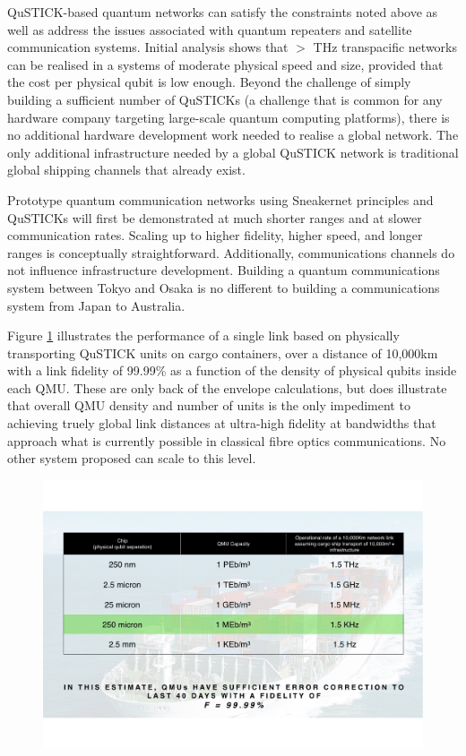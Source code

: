 \documentclass[twocolumn, aps, rmp, amsmath, amssymb, nofootinbib, superscriptaddress, longbibliography, floatfix, table-of-contents, eqsecnum]{revtex4-2}
\begin{document}
QuSTICK-based quantum networks can satisfy the constraints noted above as well as address the issues associated with quantum repeaters and satellite communication systems. Initial analysis shows that $>$ THz transpacific networks can be realised in a systems of moderate physical speed and size, provided that the cost per physical qubit is low enough. Beyond the challenge of simply building a sufficient number of QuSTICKs (a challenge that is common for any hardware company targeting large-scale quantum computing platforms), there is no additional hardware development work needed to realise a global network. The only additional infrastructure needed by a global QuSTICK network is traditional global shipping channels that already exist. 

Prototype quantum communication networks using Sneakernet principles and QuSTICKs will first be demonstrated at much shorter ranges and at slower communication rates. Scaling up to higher fidelity, higher speed, and longer ranges is conceptually straightforward. Additionally, communications channels do not influence infrastructure development. Building a quantum communications system between Tokyo and Osaka is no different to building a communications system from Japan to Australia. 

Figure \ref{fig:link} illustrates the performance of a single link based on physically transporting QuSTICK units on cargo containers, over a distance of 10,000km with a link fidelity of 99.99\% as a function of the density of physical qubits inside each QMU. These are only back of the envelope calculations, but does illustrate that overall QMU density and number of units is the only impediment to achieving truely global link distances at ultra-high fidelity at bandwidths that approach what is currently possible in classical fibre optics communications. No other system proposed can scale to this level.
 
\begin{figure}[htbp!]
	\includegraphics[clip=true, width=\columnwidth]{link}
	\caption{}
	\label{fig:link}
\end{figure}
\end{document}
